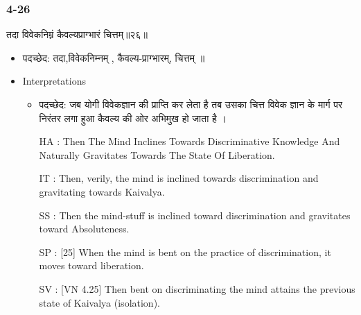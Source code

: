 \begin{frame}[fragile]\frametitle{4-26}
\begin{sanskrit}
तदा विवेकनिम्नं कैवल्यप्राग्भारं चित्तम्॥२६॥
\end{sanskrit}

	\begin{itemize}
	\item पदच्छेद:  तदा,विवेकनिम्नम् , कैवल्य-प्राग्भारम्, चित्तम् ॥
	\item Interpretations
		\begin{itemize}	
		\item पदच्छेद:  जब योगी विवेकज्ञान की प्राप्ति कर लेता है तब उसका चित्त विवेक ज्ञान के मार्ग पर निरंतर लगा हुआ कैवल्य की ओर अभिमुख हो जाता है ।
		\item [HA]: Then The Mind Inclines Towards Discriminative Knowledge And Naturally Gravitates Towards The State Of Liberation.
		\item [IT]: Then, verily, the mind is inclined towards discrimination and gravitating towards Kaivalya.
		\item [SS]: Then the mind-stuff is inclined toward discrimination and gravitates toward Absoluteness.
		\item [SP]: [25] When the mind is bent on the practice of discrimination, it moves toward liberation.
		\item [SV]: [VN 4.25] Then bent on discriminating the mind attains the previous state of Kaivalya (isolation). 
		\end{itemize}
	\end{itemize}
\end{frame}


